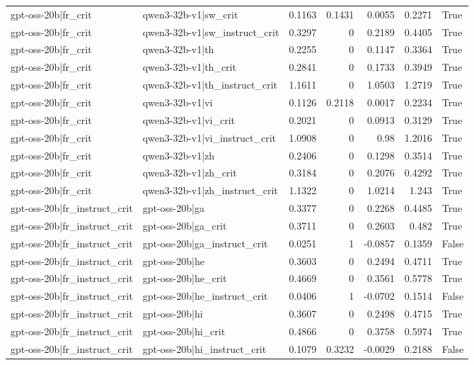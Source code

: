 \begin{table}
\begin{tabular}{l l r r r r l}
gpt-oss-20b|fr_crit & qwen3-32b-v1|sw_crit & 0.1163 & 0.1431 & 0.0055 & 0.2271 & True \\
gpt-oss-20b|fr_crit & qwen3-32b-v1|sw_instruct_crit & 0.3297 & 0 & 0.2189 & 0.4405 & True \\
gpt-oss-20b|fr_crit & qwen3-32b-v1|th & 0.2255 & 0 & 0.1147 & 0.3364 & True \\
gpt-oss-20b|fr_crit & qwen3-32b-v1|th_crit & 0.2841 & 0 & 0.1733 & 0.3949 & True \\
gpt-oss-20b|fr_crit & qwen3-32b-v1|th_instruct_crit & 1.1611 & 0 & 1.0503 & 1.2719 & True \\
gpt-oss-20b|fr_crit & qwen3-32b-v1|vi & 0.1126 & 0.2118 & 0.0017 & 0.2234 & True \\
gpt-oss-20b|fr_crit & qwen3-32b-v1|vi_crit & 0.2021 & 0 & 0.0913 & 0.3129 & True \\
gpt-oss-20b|fr_crit & qwen3-32b-v1|vi_instruct_crit & 1.0908 & 0 & 0.98 & 1.2016 & True \\
gpt-oss-20b|fr_crit & qwen3-32b-v1|zh & 0.2406 & 0 & 0.1298 & 0.3514 & True \\
gpt-oss-20b|fr_crit & qwen3-32b-v1|zh_crit & 0.3184 & 0 & 0.2076 & 0.4292 & True \\
gpt-oss-20b|fr_crit & qwen3-32b-v1|zh_instruct_crit & 1.1322 & 0 & 1.0214 & 1.243 & True \\
gpt-oss-20b|fr_instruct_crit & gpt-oss-20b|ga & 0.3377 & 0 & 0.2268 & 0.4485 & True \\
gpt-oss-20b|fr_instruct_crit & gpt-oss-20b|ga_crit & 0.3711 & 0 & 0.2603 & 0.482 & True \\
gpt-oss-20b|fr_instruct_crit & gpt-oss-20b|ga_instruct_crit & 0.0251 & 1 & -0.0857 & 0.1359 & False \\
gpt-oss-20b|fr_instruct_crit & gpt-oss-20b|he & 0.3603 & 0 & 0.2494 & 0.4711 & True \\
gpt-oss-20b|fr_instruct_crit & gpt-oss-20b|he_crit & 0.4669 & 0 & 0.3561 & 0.5778 & True \\
gpt-oss-20b|fr_instruct_crit & gpt-oss-20b|he_instruct_crit & 0.0406 & 1 & -0.0702 & 0.1514 & False \\
gpt-oss-20b|fr_instruct_crit & gpt-oss-20b|hi & 0.3607 & 0 & 0.2498 & 0.4715 & True \\
gpt-oss-20b|fr_instruct_crit & gpt-oss-20b|hi_crit & 0.4866 & 0 & 0.3758 & 0.5974 & True \\
gpt-oss-20b|fr_instruct_crit & gpt-oss-20b|hi_instruct_crit & 0.1079 & 0.3232 & -0.0029 & 0.2188 & False \\

\end{tabular}
\end{table}
